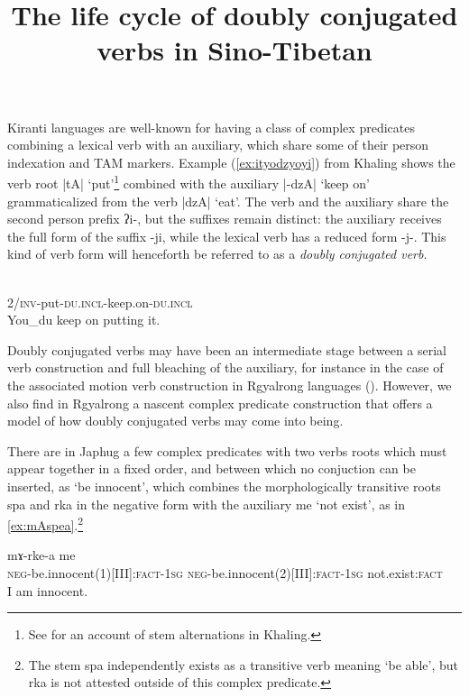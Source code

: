 \documentclass[oldfontcommands,oneside,a4paper,11pt]{article}
\newcommand{\ipa}[1]{{\phon \mbox{#1}}} %
\begin{document}
 
\title{The life cycle of doubly conjugated verbs in Sino-Tibetan}
\maketitle


Kiranti languages are well-known for having a class of complex predicates combining a lexical verb with an auxiliary, which share some of their person indexation and TAM markers. Example (\ref{ex:ityodzyoyi}) from Khaling shows the verb root |tA| `put'\footnote{See \citealt{jacques12khaling} for an account of stem alternations in Khaling.} combined with the auxiliary |-dzA| `keep on' grammaticalized from the verb |dzA| `eat'. The verb and the auxiliary share the second person prefix \ipa{ʔi-}, but the suffixes remain distinct: the auxiliary receives the full form of the suffix \ipa{-ji}, while the lexical verb has a reduced form \ipa{-j-}. This kind of verb form will henceforth be referred to as a \textit{doubly conjugated verb}.

\begin{exe}
\ex \label{ex:ityodzyoyi}
\gll \ipa{ʔi-tɵ-j-dzɵ-ji}\\
2/\textsc{inv}-put-\textsc{du.incl}-keep.on-\textsc{du.incl} \\
\glt You_{du} keep on putting it.
\end{exe}

Doubly conjugated verbs may have been an intermediate stage between a serial verb construction and full bleaching of the auxiliary, for instance in the case of the associated motion verb construction in Rgyalrong languages (\citealt{jacques13harmonization}). However, we also find in Rgyalrong a nascent complex predicate construction that offers a model of how doubly conjugated verbs may come into being.

There are in Japhug a few complex predicates with two verbs roots which must appear together in a fixed order, and between which no conjuction can be inserted, as `be innocent', which combines the morphologically transitive roots \ipa{spa} and \ipa{rka} in the negative form with the auxiliary \ipa{me} `not exist', as in \ref{ex:mAspea}.\footnote{The stem \ipa{spa} independently exists as a transitive verb meaning `be able', but \ipa{rka} is not attested outside of this complex predicate.}

\begin{exe}
\ex \label{ex:mAspea}
\gll \ipa{mɤ-spe-a} \ipa{mɤ-rke-a} \ipa{me} \\
\textsc{neg}-be.innocent(1)[III]:\textsc{fact}-\textsc{1sg} \textsc{neg}-be.innocent(2)[III]:\textsc{fact}-\textsc{1sg} not.exist:\textsc{fact} \\
\glt I am innocent.
\end{exe} 
\end{document}
